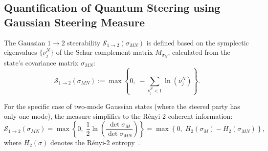 \subsection{Quantification of Quantum Steering using Gaussian Steering Measure}


The Gaussian $1 \rightarrow 2$ steerability $\mathcal{S}_{1 \rightarrow 2}(\sigma_{MN})$ is defined based on the symplectic eigenvalues $\{\bar{\nu}^{N}_{j}\}$ of the Schur complement matrix $M_{\sigma_{N}}$, calculated from the state's covariance matrix $\sigma_{MN}$:
\begin{equation}
	\mathcal{S}_{1 \rightarrow 2}(\sigma_{MN}) := 
	\max \left\{ 0,\; - \sum_{\bar{\nu}^{N}_{j} < 1} \ln \left( \bar{\nu}^{N}_{j} \right) \right\}.
\end{equation}

For the specific case of two-mode Gaussian states (where the steered party has only one mode), the measure simplifies to the Rényi-2 coherent information:
\begin{equation}
	\mathcal{S}_{1 \rightarrow 2}(\sigma_{MN}) =
	\max \left\{ 0,\; \frac{1}{2}\ln\left( \frac{\det \sigma_{M}}{\det \sigma_{MN}} \right) \right\}
	= \max \left\{ 0,\; H_{2}(\sigma_{M}) - H_{2}(\sigma_{MN}) \right\},
\end{equation}
where $H_{2}(\sigma)$ denotes the Rényi-2 entropy~\cite{Kogias2015}.



